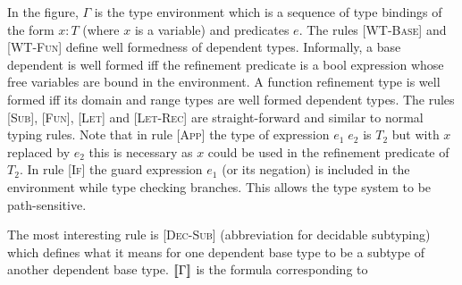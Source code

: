 %
In the figure, $\Gamma$ is the type environment which is a sequence of
type bindings of the form $x:T$ (where $x$ is a variable) and predicates $e$. 
The rules \textsc{[WT-Base]} and \textsc{[WT-Fun]} define well formedness of dependent types. Informally, a base dependent is well formed iff the refinement predicate is a bool expression whose free variables are bound in the environment. A function refinement type is well formed iff its domain and range types are well formed dependent types. The rules \textsc{[Sub]}, \textsc{[Fun]}, \textsc{[Let]} and \textsc{[Let-Rec]} are straight-forward and similar to normal typing rules.
Note that in rule \textsc{[App]} the type of expression $e_1 \; e_2$ is $T_2$ but
with $x$ replaced by $e_2$ this is necessary as $x$ could be used in the refinement
predicate of $T_2$. In rule \textsc{[If]} the guard expression $e_1$ (or its negation) is included in the environment while type checking branches. This
allows the type system to be path-sensitive. 

The most interesting rule is \textsc{[Dec-Sub]} (abbreviation for decidable subtyping) which defines what it means for one dependent base type to be a subtype of another dependent base type. $[\![\Gamma]\!]$ is the formula corresponding to 
